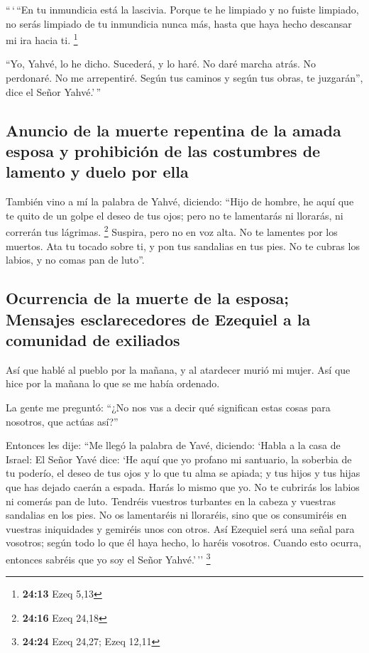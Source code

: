  ``\,`\,``En tu inmundicia está la lascivia. Porque te he
limpiado y no fuiste limpiado, no serás limpiado de tu inmundicia nunca
más, hasta que haya hecho descansar mi ira hacia ti. \footnote{\textbf{24:13}
  Ezeq 5,13}

 ``Yo, Yahvé, lo he dicho. Sucederá, y lo haré. No daré
marcha atrás. No perdonaré. No me arrepentiré. Según tus caminos y según
tus obras, te juzgarán'', dice el Señor Yahvé.'\,''

\hypertarget{anuncio-de-la-muerte-repentina-de-la-amada-esposa-y-prohibiciuxf3n-de-las-costumbres-de-lamento-y-duelo-por-ella}{%
\subsection{Anuncio de la muerte repentina de la amada esposa y
prohibición de las costumbres de lamento y duelo por
ella}\label{anuncio-de-la-muerte-repentina-de-la-amada-esposa-y-prohibiciuxf3n-de-las-costumbres-de-lamento-y-duelo-por-ella}}

 También vino a mí la palabra de Yahvé, diciendo:
 ``Hijo de hombre, he aquí que te quito de un golpe el
deseo de tus ojos; pero no te lamentarás ni llorarás, ni correrán tus
lágrimas. \footnote{\textbf{24:16} Ezeq 24,18}  Suspira,
pero no en voz alta. No te lamentes por los muertos. Ata tu tocado sobre
ti, y pon tus sandalias en tus pies. No te cubras los labios, y no comas
pan de luto''.

\hypertarget{ocurrencia-de-la-muerte-de-la-esposa-mensajes-esclarecedores-de-ezequiel-a-la-comunidad-de-exiliados}{%
\subsection{Ocurrencia de la muerte de la esposa; Mensajes
esclarecedores de Ezequiel a la comunidad de
exiliados}\label{ocurrencia-de-la-muerte-de-la-esposa-mensajes-esclarecedores-de-ezequiel-a-la-comunidad-de-exiliados}}

 Así que hablé al pueblo por la mañana, y al atardecer
murió mi mujer. Así que hice por la mañana lo que se me había ordenado.

 La gente me preguntó: ``¿No nos vas a decir qué
significan estas cosas para nosotros, que actúas así?''

 Entonces les dije: ``Me llegó la palabra de Yavé,
diciendo:  `Habla a la casa de Israel: El Señor Yavé
dice: `He aquí que yo profano mi santuario, la soberbia de tu poderío,
el deseo de tus ojos y lo que tu alma se apiada; y tus hijos y tus hijas
que has dejado caerán a espada.  Harás lo mismo que yo.
No te cubrirás los labios ni comerás pan de luto. 
Tendréis vuestros turbantes en la cabeza y vuestras sandalias en los
pies. No os lamentaréis ni lloraréis, sino que os consumiréis en
vuestras iniquidades y gemiréis unos con otros.  Así
Ezequiel será una señal para vosotros; según todo lo que él haya hecho,
lo haréis vosotros. Cuando esto ocurra, entonces sabréis que yo soy el
Señor Yahvé.'\,'' \footnote{\textbf{24:24} Ezeq 24,27; Ezeq 12,11}


